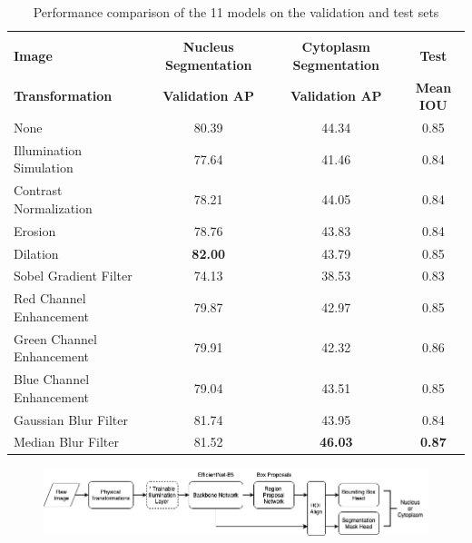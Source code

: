 \documentclass{article}
\begin{document}
\begin{table}[b]
  \caption{Performance comparison of the 11 models on the validation and test sets}
  \label{sample-table}
  \centering
  \begin{tabular}{lccc}
    \toprule
    \multicolumn{2}{c}{ }\\
    {\bf Image} & {\bf Nucleus Segmentation} & {\bf Cytoplasm Segmentation} & {\bf Test} \\
    {\bf Transformation} & {\bf Validation AP} & {\bf Validation AP} & {\bf Mean IOU}   \\
    \midrule
    None & 80.39 & 44.34 & 0.85 \\
    \midrule
    Illumination Simulation & 77.64 & 41.46 & 0.84 \\
    \midrule
    Contrast Normalization & 78.21 & 44.05 & 0.84 \\
    \midrule
    Erosion & 78.76 & 43.83 & 0.84 \\
    \midrule
    Dilation & {\bf 82.00} & 43.79 & 0.85 \\
    \midrule
    Sobel Gradient Filter & 74.13 & 38.53 & 0.83 \\
    \midrule
    Red Channel Enhancement & 79.87 & 42.97 & 0.85 \\
    \midrule
    Green Channel Enhancement & 79.91 & 42.32 & 0.86 \\
    \midrule
    Blue Channel Enhancement & 79.04 & 43.51 & 0.85 \\
    \midrule
    Gaussian Blur Filter & 81.74 & 43.95 & 0.84 \\
    \midrule
    Median Blur Filter & 81.52 & {\bf 46.03} & {\bf 0.87} \\
   \bottomrule
 \end{tabular}
\end{table}

\begin{figure}
  \centering
  \begin{minipage}{1\textwidth}
    \centering
    \includegraphics[width=1\linewidth]{10.png}
  \end{minipage}%
\end{figure}
\end{document}
